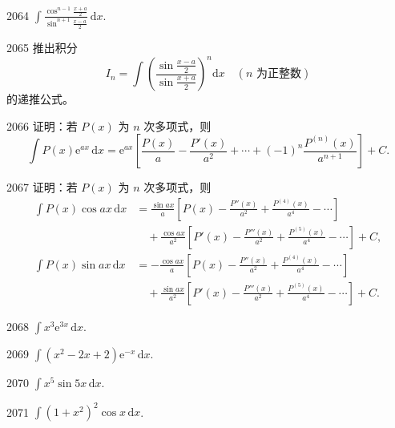 \begin{prob}[M]{2064}
$\int \frac{\cos^{n-1} \frac{x + a}{2}}{\sin^{n+1} \frac{x - a}{2}}\,\mathrm{d}x$.
\end{prob}

\begin{prob}[M]{2065}
推出积分
\[
I_n = \int \left(\frac{\sin \frac{x - a}{2}}{\sin \frac{x + a}{2}}\right)^n \mathrm{d}x \quad (n \text{ 为正整数})
\]
的递推公式。
\end{prob}


\begin{prob}[M]{2066}
证明：若 $P(x)$ 为 $n$ 次多项式，则
\[
\int P(x)\mathrm{e}^{ax}\,\mathrm{d}x = \mathrm{e}^{ax}\left[\frac{P(x)}{a} - \frac{P'(x)}{a^2} + \cdots + (-1)^n \frac{P^{(n)}(x)}{a^{n+1}}\right] + C.
\]
\end{prob}

\begin{prob}[M]{2067}
证明：若 $P(x)$ 为 $n$ 次多项式，则
\begin{align*}
\int P(x)\cos ax\,\mathrm{d}x &= \frac{\sin ax}{a}\left[P(x) - \frac{P''(x)}{a^2} + \frac{P^{(4)}(x)}{a^4} - \cdots\right] \\
&\quad + \frac{\cos ax}{a^2}\left[P'(x) - \frac{P'''(x)}{a^2} + \frac{P^{(5)}(x)}{a^4} - \cdots\right] + C, \\
\int P(x)\sin ax\,\mathrm{d}x &= -\frac{\cos ax}{a}\left[P(x) - \frac{P''(x)}{a^2} + \frac{P^{(4)}(x)}{a^4} - \cdots\right] \\
&\quad + \frac{\sin ax}{a^2}\left[P'(x) - \frac{P'''(x)}{a^2} + \frac{P^{(5)}(x)}{a^4} - \cdots\right] + C.
\end{align*}
\end{prob}


\begin{prob}[S]{2068}
$\int x^3 \mathrm{e}^{3x}\,\mathrm{d}x$.
\end{prob}

\begin{prob}[S]{2069}
$\int (x^2 - 2x + 2)\mathrm{e}^{-x}\,\mathrm{d}x$.
\end{prob}

\begin{prob}[S]{2070}
$\int x^5 \sin 5x \,\mathrm{d}x$.
\end{prob}

\begin{prob}[S]{2071}
$\int (1 + x^2)^2 \cos x \,\mathrm{d}x$.
\end{prob}


